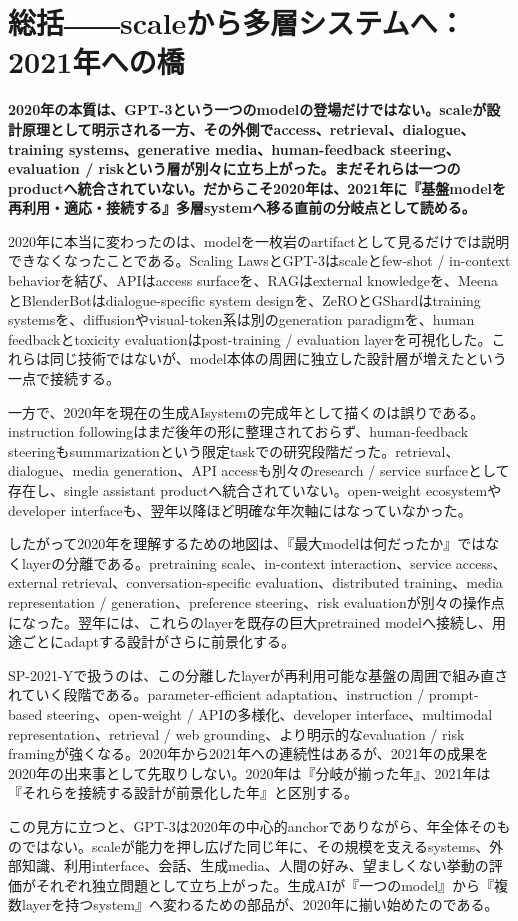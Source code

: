 \section{総括――scaleから多層システムへ：2021年への橋}
\label{pkg:synthesis-transition-2021}
\noindent\textbf{2020年の本質は、GPT-3という一つのmodelの登場だけではない。scaleが設計原理として明示される一方、その外側でaccess、retrieval、dialogue、training systems、generative media、human-feedback steering、evaluation / riskという層が別々に立ち上がった。まだそれらは一つのproductへ統合されていない。だからこそ2020年は、2021年に『基盤modelを再利用・適応・接続する』多層systemへ移る直前の分岐点として読める。}

2020年に本当に変わったのは、modelを一枚岩のartifactとして見るだけでは説明できなくなったことである。Scaling LawsとGPT-3はscaleとfew-shot / in-context behaviorを結び、APIはaccess surfaceを、RAGはexternal knowledgeを、MeenaとBlenderBotはdialogue-specific system designを、ZeROとGShardはtraining systemsを、diffusionやvisual-token系は別のgeneration paradigmを、human feedbackとtoxicity evaluationはpost-training / evaluation layerを可視化した。これらは同じ技術ではないが、model本体の周囲に独立した設計層が増えたという一点で接続する。


一方で、2020年を現在の生成AIsystemの完成年として描くのは誤りである。instruction followingはまだ後年の形に整理されておらず、human-feedback steeringもsummarizationという限定taskでの研究段階だった。retrieval、dialogue、media generation、API accessも別々のresearch / service surfaceとして存在し、single assistant productへ統合されていない。open-weight ecosystemやdeveloper interfaceも、翌年以降ほど明確な年次軸にはなっていなかった。


したがって2020年を理解するための地図は、『最大modelは何だったか』ではなくlayerの分離である。pretraining scale、in-context interaction、service access、external retrieval、conversation-specific evaluation、distributed training、media representation / generation、preference steering、risk evaluationが別々の操作点になった。翌年には、これらのlayerを既存の巨大pretrained modelへ接続し、用途ごとにadaptする設計がさらに前景化する。


SP-2021-Yで扱うのは、この分離したlayerが再利用可能な基盤の周囲で組み直されていく段階である。parameter-efficient adaptation、instruction / prompt-based steering、open-weight / APIの多様化、developer interface、multimodal representation、retrieval / web grounding、より明示的なevaluation / risk framingが強くなる。2020年から2021年への連続性はあるが、2021年の成果を2020年の出来事として先取りしない。2020年は『分岐が揃った年』、2021年は『それらを接続する設計が前景化した年』と区別する。


この見方に立つと、GPT-3は2020年の中心的anchorでありながら、年全体そのものではない。scaleが能力を押し広げた同じ年に、その規模を支えるsystems、外部知識、利用interface、会話、生成media、人間の好み、望ましくない挙動の評価がそれぞれ独立問題として立ち上がった。生成AIが『一つのmodel』から『複数layerを持つsystem』へ変わるための部品が、2020年に揃い始めたのである。

